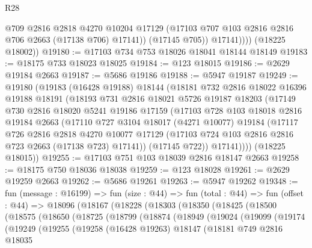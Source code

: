 \begin{lexlean}{R28}
\begin{coremodule}
                  @709
                  @2816
                  @2818
                  @4270
                  @10204
                  @17129
                  (@17103 @707 @103 @2816 @2816 @706 @2663 (@17138 @706) @17141))
                (@17145 @705))
              @17141))))
      (@18225 @18002))
@19180 := @17103 @734 @753 @18026 @18041 @18144 @18149
@19183 := @18175 @733 @18023 @18025
@19184 := @123 @18015
@19186 := @2629 @19184 @2663
@19187 := @5686 @19186
@19188 := @5947 @19187
@19249 := @19180
    (@19183
      (@16428 @19188)
      @18144
      (@18181
        @732
        @2816
        @18022
        @16396
        @19188
        @18191
        (@18193
          @731
          @2816
          @18021
          @5726
          @19187
          @18203
          (@17149
            @730
            @2816
            @18020
            @5241
            @19186
            @17159
            (@17103
              @728
              @103
              @18018
              @2816
              @19184
              @2663
              (@17110
                @727
                @3104
                @18017
                (@4271 @10077)
                @19184
                (@17117
                  @726
                  @2816
                  @2818
                  @4270
                  @10077
                  @17129
                  (@17103 @724 @103 @2816 @2816 @723 @2663 (@17138 @723) @17141))
                (@17145 @722))
              @17141))))
      (@18225 @18015))
@19255 := @17103 @751 @103 @18039 @2816 @18147 @2663
@19258 := @18175 @750 @18036 @18038
@19259 := @123 @18028
@19261 := @2629 @19259 @2663
@19262 := @5686 @19261
@19263 := @5947 @19262
@19348 := fun (message : @16199) =>
  fun (size : @44) =>
  fun (total : @44) =>
  fun (offset : @44) =>
  @18096
    (@18167
      (@18228
        (@18303
          (@18350
            (@18425
              (@18500
                (@18575
                  (@18650
                    (@18725
                      (@18799
                        (@18874
                          (@18949
                            (@19024
                              (@19099
                                (@19174
                                  (@19249
                                    (@19255
                                      (@19258
                                        (@16428 @19263)
                                        @18147
                                        (@18181
                                          @749
                                          @2816
                                          @18035

\end{coremodule}
\end{lexlean}
